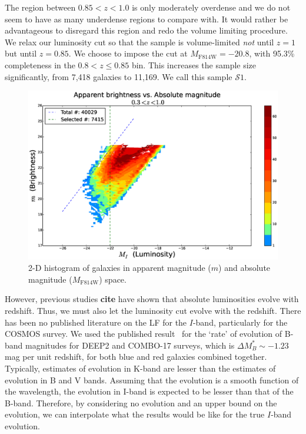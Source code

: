\documentclass[twocolumn,useAMS,usenatbib]{mn2e}
\newcommand{\s}{\ensuremath{\mathcal{S}}}
\begin{document}
The region between $0.85<z<1.0$ is only moderately overdense and we do not seem to have as many underdense regions to compare with. It would rather be advantageous to disregard this region
and redo the volume limiting procedure.
We relax our luminosity cut %
so that the sample is volume-limited \emph{not} until $z=1$ but until $z=0.85$. 
We choose to impose the cut at $M_\text{F814W}=-20.8$, with 95.3\% completeness in the $0.8 < z \le 0.85$ bin. This increases the sample size significantly, from 7,418 galaxies to 11,169. We call this sample \s$1$.

\begin{figure}
  \centering
   \includegraphics[width=\columnwidth]{hist2d_mag_mi}
   \caption{2-D histogram of galaxies in apparent magnitude ($m$) and absolute magnitude ($M_\text{F814W}$) space.}
   \label{fig:2Dhist}
 \end{figure}
 
However, previous studies {\bf cite} have shown that absolute luminosities evolve with redshift. Thus, we must also let the luminosity cut evolve with the redshift. 
There has been no published literature on the LF for the $I$-band, particularly for the COSMOS survey.
We used the published result~\citep{Faber2007} for the `rate' of evolution of B-band magnitudes for DEEP2 and COMBO-17 surveys, which is $ \Delta M_B^* \sim -1.23$ mag per unit redshift, for both blue and red galaxies combined together.
Typically, estimates of evolution in K-band are lesser than the estimates of evolution in B and V bands.
Assuming that the evolution is a smooth function of the wavelength, the evolution in I-band is expected to be lesser than that of the B-band. 
Therefore, by considering no evolution and an upper bound on the evolution, we can interpolate what the results would be like for the true $I$-band evolution.
\end{document}
